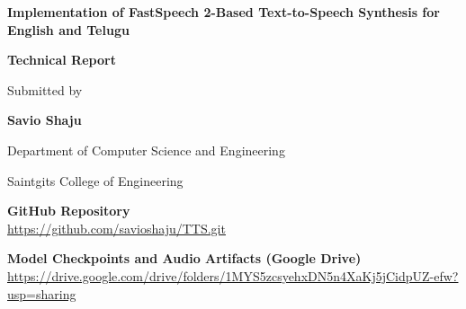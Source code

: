 \documentclass[11pt,a4paper]{report}
\begin{document}
\begin{titlepage}
\begin{center}
\vspace*{1cm}
{\Huge \textbf{Implementation of FastSpeech 2-Based Text-to-Speech Synthesis for English and Telugu}}

\vspace{1.5cm}
{\Large \textbf{Technical Report}}

\vspace{1.5cm}
Submitted by

\vspace{0.4cm}
{\Large \textbf{Savio Shaju}}

\vspace{1.2cm}
Department of Computer Science and Engineering

\vspace{0.2cm}
Saintgits College of Engineering

\vspace{1.2cm}
\textbf{GitHub Repository}\\
\vspace{0.2cm}
\url{https://github.com/savioshaju/TTS.git}

\vspace{0.8cm}
\textbf{Model Checkpoints and Audio Artifacts (Google Drive)}\\
\vspace{0.2cm}
\url{https://drive.google.com/drive/folders/1MYS5zcsyehxDN5n4XaKj5jCidpUZ-efw?usp=sharing}

\vfill
\end{center}
\end{titlepage}


\end{document}
